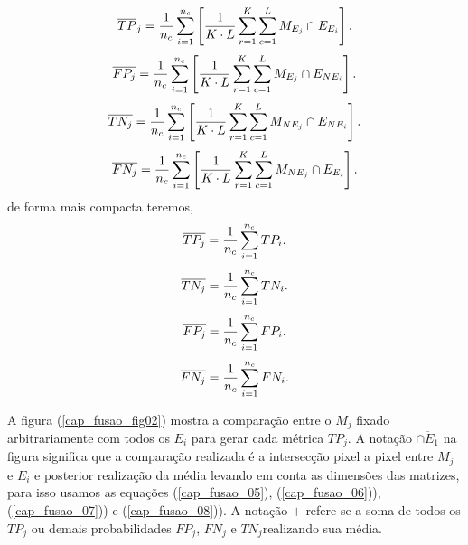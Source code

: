 \begin{equation}\label{eq:verdadeiro_positivo_media}
	\overline{TP}_j=\frac{1}{n_c}\sum_{i=1}^{n_c} \left[ \frac{1}{K\cdot L}\sum_{r=1}^{K}\sum_{c=1}^{L} M_{E_j}\cap E_{E_i}\right]. \\
\end{equation}
\begin{equation}\label{eq:falso_positivo_media}
	\overline{FP_j}=\frac{1}{n_c}\sum_{i=1}^{n_c} \left[ \frac{1}{K\cdot L}\sum_{r=1}^{K}\sum_{c=1}^{L} M_{E_j}\cap E_{NE_i}\right]. \\
\end{equation}
\begin{equation}\label{eq:verdadeiro_negativo_media}
	\overline{TN_j}=\frac{1}{n_c}\sum_{i=1}^{n_c} \left[ \frac{1}{K\cdot L}\sum_{r=1}^{K}\sum_{c=1}^{L} M_{NE_j}\cap E_{NE_i}\right]. \\
\end{equation}
\begin{equation}\label{eq:falso_negativo_media}
	\overline{FN_j}=\frac{1}{n_c}\sum_{i=1}^{n_c} \left[ \frac{1}{K\cdot L}\sum_{r=1}^{K}\sum_{c=1}^{L} M_{NE_j}\cap E_{E_i}\right]. \\
\end{equation}
de forma mais compacta teremos,
\begin{equation}\label{eq:verdadeiro_positivo_media_comp}
\overline{TP_j}=\frac{1}{n_c}\sum_{i=1}^{n_c} TP_i. \\
\end{equation}
\begin{equation}\label{eq:falso_positivo_media_comp}
\overline{TN_j}=\frac{1}{n_c}\sum_{i=1}^{n_c} TN_i. \\
\end{equation}
\begin{equation}\label{eq:verdadeiro_negativo_media_comp}
\overline{FP_j}=\frac{1}{n_c}\sum_{i=1}^{n_c} FP_i. \\
\end{equation}
\begin{equation}\label{eq:falso_negativo_media_comp}
\overline{FN_j}=\frac{1}{n_c}\sum_{i=1}^{n_c} FN_i. \\
\end{equation}

A figura (\ref{cap_fusao_fig02}) mostra a comparação entre o $M_j$ fixado arbitrariamente com todos os $E_i$ para gerar cada métrica $TP_j$. A notação $\overline{\cap E_1}$ na figura significa que a comparação realizada é a intersecção pixel a pixel entre $M_j$ e $E_i$ e posterior realização da média levando em conta as dimensões das matrizes, para isso usamos as equações (\ref{cap_fusao_05}), (\ref{cap_fusao_06})), (\ref{cap_fusao_07})) e (\ref{cap_fusao_08})). A notação $+$ refere-se a soma de todos os $TP_j$ ou demais probabilidades $FP_j$, $FN_j$ e $TN_j$realizando sua média.

